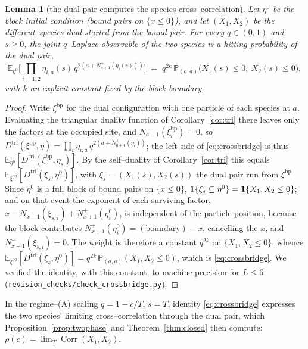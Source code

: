 \documentclass[11pt]{article}
\theoremstyle{plain}
\newtheorem{lemma}[theorem]{Lemma}
\theoremstyle{definition}
\theoremstyle{remark}
\DeclareMathOperator{\Corr}{Corr}\DeclareMathOperator{\cum}{cum}
\newcommand{\E}{\mathbb{E}}\newcommand{\PP}{\mathbb{P}}\newcommand{\dd}{\,\mathrm{d}}
\begin{document}
\begin{lemma}[the dual pair computes the species cross--correlation]\label{lem:crossbridge}
Let $\eta^0$ be the block initial condition (bound pairs on $\{x\le0\}$), and let
$(X_1,X_2)$ be the different--species dual started from the bound pair. For every
$q\in(0,1)$ and $s\ge0$, the joint $q$--Laplace observable of the two species is a
hitting probability of the dual pair,
\begin{equation}\label{eq:crossbridge}
  \E_{\eta^0}\Big[\textstyle\prod_{i=1,2}\eta_{i,a}(s)\,
     q^{2\left(a+N^+_{a+1}(\eta_i(s))\right)}\Big]
   \;=\; q^{2k}\,\PP_{(a,a)}\big(X_1(s)\le0,\ X_2(s)\le0\big),
\end{equation}
with $k$ an explicit constant fixed by the block boundary.
\end{lemma}
\begin{proof}
Write $\xi^{\mathrm{bp}}$ for the dual configuration with one particle of each species at
$a$. Evaluating the triangular duality function of Corollary~\ref{cor:tri} there leaves
only the factors at the occupied site, and $N^-_{a-1}(\xi^{\mathrm{bp}}_i)=0$, so
$D^{\mathrm{tri}}(\xi^{\mathrm{bp}},\eta)=\prod_i\eta_{i,a}\,q^{2(a+N^+_{a+1}(\eta_i))}$;
the left side of \eqref{eq:crossbridge} is thus
$\E_{\eta^0}[D^{\mathrm{tri}}(\xi^{\mathrm{bp}},\eta_s)]$. By the self--duality of
Corollary~\ref{cor:tri} this equals $\E_{\xi^{\mathrm{bp}}}[D^{\mathrm{tri}}(\xi_s,\eta^0)]$,
with $\xi_s=(X_1(s),X_2(s))$ the dual pair run from $\xi^{\mathrm{bp}}$. Since $\eta^0$ is
a full block of bound pairs on $\{x\le0\}$, $\mathbf 1\{\xi_s\subseteq\eta^0\}=\mathbf 1\{X_1,X_2\le0\}$;
and on that event the exponent of each surviving factor,
$x-N^-_{x-1}(\xi_{s,i})+N^+_{x+1}(\eta^0_i)$, is independent of the particle position,
because the block contributes $N^+_{x+1}(\eta^0_i)=(\text{boundary})-x$, cancelling the
$x$, and $N^-_{x-1}(\xi_{s,i})=0$. The weight is therefore a constant $q^{2k}$ on
$\{X_1,X_2\le0\}$, whence
$\E_{\xi^{\mathrm{bp}}}[D^{\mathrm{tri}}(\xi_s,\eta^0)]=q^{2k}\,\PP_{(a,a)}(X_1,X_2\le0)$,
which is \eqref{eq:crossbridge}. We verified the identity, with this constant, to machine
precision for $L\le6$ (\texttt{revision\_checks/check\_crossbridge.py}).
\end{proof}

In the regime--(A) scaling $q=1-c/T$, $s=T$, identity \eqref{eq:crossbridge} expresses the
two species' limiting cross--correlation through the dual pair, which
Proposition~\ref{prop:twophase} and Theorem~\ref{thm:closed} then compute:
$\rho(c)=\lim_T\Corr(X_1,X_2)$.
\end{document}
